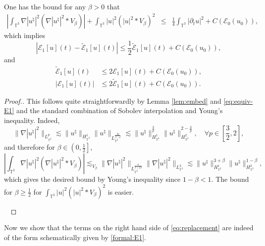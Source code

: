 \begin{lem}
  One has the bound for any $\beta > 0$ that
  \begin{eqnarray*}
    \left| \int_{\mathbb{T}^3} \nabla | u^{\natural} |^2 (\nabla |
    u^{\natural} |^2 \ast V_{\beta}) \right| + \int_{\mathbb{T}^3} | u |^2 (|
    u |^2 \ast V_{\beta})^2 & \leqslant & \frac{1}{4} \int_{\mathbb{T}^3} |
    \partial_t u |^2 + C (\mathcal{E}_0 (u_0)),
  \end{eqnarray*}
  which implies
  \[ | \mathcal{E}_1 [u] (t) - \tilde{\mathcal{E}}_1 [u] (t) | \leqslant
     \frac{1}{2} \tilde{\mathcal{E}}_1 [u] (t) + C (\mathcal{E}_0 (u_0)), \]
  and
  \begin{eqnarray*}
    \tilde{\mathcal{E}}_1 [u] (t) & \leqslant 2\mathcal{E}_1 [u] (t) + C
    (\mathcal{E}_0 (u_0)),\\
    | \mathcal{E}_1 [u] (t) | & \leqslant 2 \tilde{\mathcal{E}}_1 [u] (t) + C
    (\mathcal{E}_0 (u_0)) .
  \end{eqnarray*}
\end{lem}

\begin{proof}[Proof.]
  This follows quite straightforwardly by Lemma \ref{lem:embed} and
  \eqref{eq:equiv-E1} and the standard combination of Sobolev interpolation
  and Young's inequality. Indeed,
  \[ \| \nabla | u^{\natural} |^2  \|_{L_{\mathbb{T}^3}^p} \lesssim \|
     u^{\natural} \|_{H_{\mathbb{T}^3}^1} \| u^{\natural}
     \|_{L_{\mathbb{T}^3}^{\frac{2 p}{2 - p}}} \lesssim \| u^{\natural}
     \|^{\frac{3}{p}}_{H_{\mathbb{T}^3}^1} \| u^{\natural} \|^{2 -
     \frac{3}{p}}_{H_{\mathbb{T}^3}^2}, \quad \forall p \in \left[
     \frac{3}{2}, 2 \right], \]
  and therefore for $\beta \in \left( 0, \frac{1}{2} \right]$,
  \[ \left| \int_{\mathbb{T}^3} \nabla | u^{\natural} |^2 (\nabla |
     u^{\natural} |^2 \ast V_{\beta}) \right| \lesssim_{V_{\beta}} \| \nabla |
     u^{\natural} |^2  \|_{{L^{\frac{6}{3 + 2 \beta}}_{\mathbb{T}^3}} } \|
     \nabla | u^{\natural} |^2  \|_{L_{\mathbb{T}^3}^2} \lesssim \|
     u^{\natural} \|^{3 + \beta}_{H_{\mathbb{T}^3}^1} \| u^{\natural} \|^{1 -
     \beta}_{H_{\mathbb{T}^3}^2}, \]
  which gives the desired bound by Young's inequality since $1 - \beta < 1$.
  The bound for $\beta \geqslant \frac{1}{2}$ for $\int_{\mathbb{T}^3} | u |^2
  (| u |^2 \ast V_{\beta})^2$ is easier.
  
  \ 
\end{proof}

Now we show that the terms on the right hand side of \eqref{eq:replacement}
are indeed of the form schematically given by \eqref{formal:E1}.

